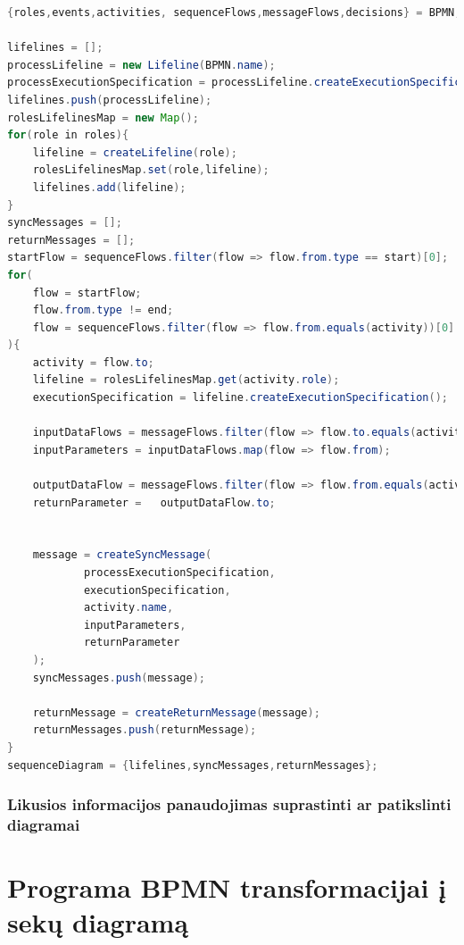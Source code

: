 \documentclass{VUMIFInfBakalaurinis}
\begin{document}
\begin{lstlisting}[language=java, caption={\textbf{UML} \textbf{Sekų diagramos} gavimo iš \textbf{BPMN} modelio algoritmo pseudokodas}, label={lst:bpmn_to_sd_algorythm_pseudocode}]
{roles,events,activities, sequenceFlows,messageFlows,decisions} = BPMN;

lifelines = [];
processLifeline = new Lifeline(BPMN.name);
processExecutionSpecification = processLifeline.createExecutionSpecification();
lifelines.push(processLifeline);
rolesLifelinesMap = new Map();
for(role in roles){
	lifeline = createLifeline(role);
	rolesLifelinesMap.set(role,lifeline);
	lifelines.add(lifeline);
}
syncMessages = [];
returnMessages = [];
startFlow = sequenceFlows.filter(flow => flow.from.type == start)[0];
for(
	flow = startFlow;
	flow.from.type != end;
	flow = sequenceFlows.filter(flow => flow.from.equals(activity))[0]
){
	activity = flow.to;
	lifeline = rolesLifelinesMap.get(activity.role);
	executionSpecification = lifeline.createExecutionSpecification();
	
	inputDataFlows = messageFlows.filter(flow => flow.to.equals(activity));
	inputParameters = inputDataFlows.map(flow => flow.from);
	
	outputDataFlow = messageFlows.filter(flow => flow.from.equals(activity))[0];
	returnParameter = 	outputDataFlow.to;
	
	
	message = createSyncMessage(
			processExecutionSpecification,
			executionSpecification,
			activity.name,
			inputParameters,
			returnParameter
	);
	syncMessages.push(message);	
	
	returnMessage = createReturnMessage(message);
	returnMessages.push(returnMessage);	
}
sequenceDiagram = {lifelines,syncMessages,returnMessages};
\end{lstlisting}

\subsubsection{Likusios informacijos panaudojimas suprastinti ar patikslinti diagramai}


\section{Programa \textbf{BPMN} transformacijai į \textbf{sekų diagramą}}   


\end{document}
